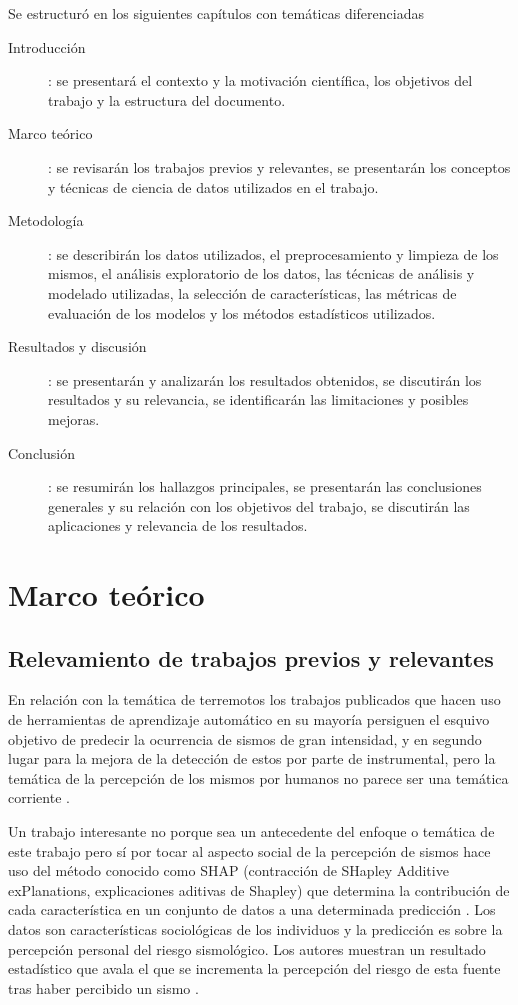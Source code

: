 \documentclass[a4paper]{report}
\begin{document}
Se estructuró en los siguientes capítulos con temáticas diferenciadas
\begin{description}
	\item[Introducción]: se presentará el contexto y la motivación científica, los objetivos del trabajo y la estructura del documento.
	\item[Marco teórico]: se revisarán los trabajos previos y relevantes, se presentarán los conceptos y técnicas de ciencia de datos utilizados en el trabajo.
	\item[Metodología]: se describirán los datos utilizados, el preprocesamiento y limpieza de los mismos, el análisis exploratorio de los datos, las técnicas de análisis y modelado utilizadas, la selección de características, las métricas de evaluación de los modelos y los métodos estadísticos utilizados.
	\item[Resultados y discusión]: se presentarán y analizarán los resultados obtenidos, se discutirán los resultados y su relevancia, se identificarán las limitaciones y posibles mejoras.
	\item[Conclusión]: se resumirán los hallazgos principales, se presentarán las conclusiones generales y su relación con los objetivos del trabajo, se discutirán las aplicaciones y relevancia de los resultados.
\end{description}



\chapter{Marco teórico}

\section{Relevamiento de trabajos previos y relevantes}

En relación con la temática de terremotos los trabajos publicados que hacen uso de herramientas de aprendizaje automático en su mayoría persiguen el esquivo objetivo de predecir la ocurrencia de sismos de gran intensidad, y en segundo lugar para la mejora de la detección de estos por parte de instrumental, pero la temática de la percepción de los mismos por humanos no parece ser una temática corriente \cite{hu_applying_2024}.

Un trabajo interesante no porque sea un antecedente del enfoque o temática de este trabajo pero sí por tocar al aspecto social de la percepción de sismos hace uso del método conocido como SHAP (contracción de SHapley Additive exPlanations, explicaciones aditivas de Shapley) que determina la contribución de cada característica en un conjunto de datos a una determinada predicción \cite{molnar_96_2024}.
Los datos son características sociológicas de los individuos y la predicción es sobre la percepción personal del riesgo sismológico.
Los autores muestran un resultado estadístico que avala el que se incrementa la percepción del riesgo de esta fuente tras haber percibido un sismo \cite{bedle_recognizing_2022}.
\end{document}
